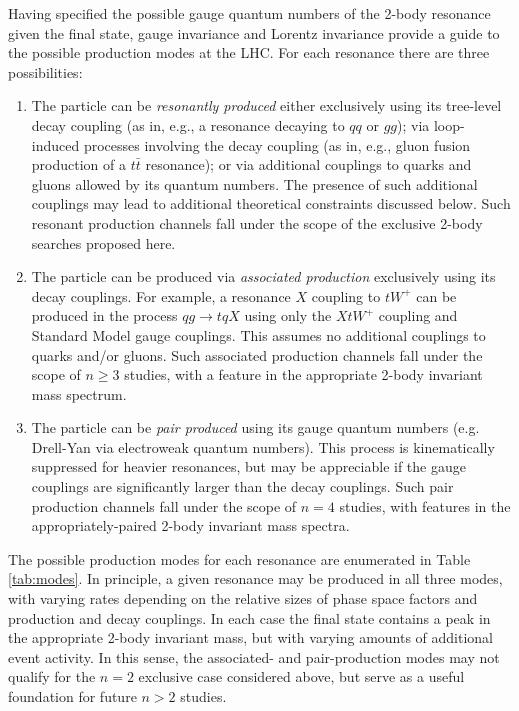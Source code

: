 Having specified the possible gauge quantum numbers of the 2-body resonance given the final state, gauge invariance and Lorentz invariance provide a guide to the possible production modes at the LHC. For each resonance there are three possibilities:

\begin{enumerate}
\item The particle can be {\it resonantly produced} either exclusively using its tree-level decay coupling (as in, e.g., a resonance decaying to $qq$ or $gg$); via loop-induced processes involving the decay coupling (as in, e.g., gluon fusion production of a $t \bar t$ resonance); or via additional couplings to quarks and gluons allowed by its quantum numbers. The presence of such additional couplings may lead to additional theoretical constraints discussed below. Such resonant production channels fall under the scope of the exclusive 2-body searches proposed here.
\item The particle can be produced via {\it associated production} exclusively using its decay couplings. For example, a resonance $X$ coupling to $tW^+$ can be produced in the process $q g \to t q X$ using only the $X t W^+$ coupling and Standard Model gauge couplings. This assumes no additional couplings to quarks and/or gluons. Such associated production channels fall under the scope of $n \geq 3$  studies, with a feature in the appropriate 2-body invariant mass spectrum.
\item The particle can be {\it pair produced} using its gauge quantum numbers (e.g. Drell-Yan via  electroweak quantum numbers). This process is kinematically suppressed for heavier resonances, but may be appreciable if the gauge couplings are significantly larger than the decay couplings. Such pair production channels fall under the scope of $n=4$ studies, with features in the appropriately-paired 2-body invariant mass spectra.
\end{enumerate}

The possible production modes for each resonance are enumerated in Table \ref{tab:modes}. In principle, a given resonance may be produced in all three modes, with varying rates depending on the relative sizes of phase space factors and production and decay couplings. In each case the final state contains a peak in the appropriate 2-body invariant mass, but with varying amounts of additional event activity. In this sense, the associated- and pair-production modes may not qualify for the $n=2$ exclusive case considered above, but serve as a useful foundation for future $n>2$ studies.

